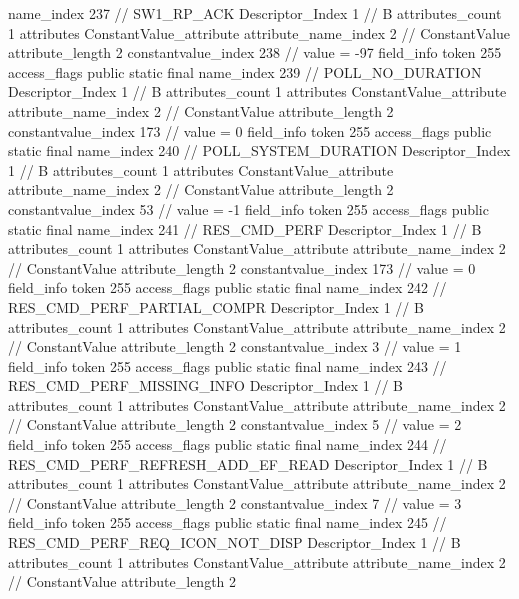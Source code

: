 {{{{{				name_index	237		// SW1_RP_ACK
				Descriptor_Index	1		// B
				attributes_count	1
				attributes {
				ConstantValue_attribute {
					attribute_name_index	2		// ConstantValue
					attribute_length	2
					constantvalue_index	238		// value = -97
				}
				}
			}
			field_info {
				token	255
				access_flags	public static final
				name_index	239		// POLL_NO_DURATION
				Descriptor_Index	1		// B
				attributes_count	1
				attributes {
				ConstantValue_attribute {
					attribute_name_index	2		// ConstantValue
					attribute_length	2
					constantvalue_index	173		// value = 0
				}
				}
			}
			field_info {
				token	255
				access_flags	public static final
				name_index	240		// POLL_SYSTEM_DURATION
				Descriptor_Index	1		// B
				attributes_count	1
				attributes {
				ConstantValue_attribute {
					attribute_name_index	2		// ConstantValue
					attribute_length	2
					constantvalue_index	53		// value = -1
				}
				}
			}
			field_info {
				token	255
				access_flags	public static final
				name_index	241		// RES_CMD_PERF
				Descriptor_Index	1		// B
				attributes_count	1
				attributes {
				ConstantValue_attribute {
					attribute_name_index	2		// ConstantValue
					attribute_length	2
					constantvalue_index	173		// value = 0
				}
				}
			}
			field_info {
				token	255
				access_flags	public static final
				name_index	242		// RES_CMD_PERF_PARTIAL_COMPR
				Descriptor_Index	1		// B
				attributes_count	1
				attributes {
				ConstantValue_attribute {
					attribute_name_index	2		// ConstantValue
					attribute_length	2
					constantvalue_index	3		// value = 1
				}
				}
			}
			field_info {
				token	255
				access_flags	public static final
				name_index	243		// RES_CMD_PERF_MISSING_INFO
				Descriptor_Index	1		// B
				attributes_count	1
				attributes {
				ConstantValue_attribute {
					attribute_name_index	2		// ConstantValue
					attribute_length	2
					constantvalue_index	5		// value = 2
				}
				}
			}
			field_info {
				token	255
				access_flags	public static final
				name_index	244		// RES_CMD_PERF_REFRESH_ADD_EF_READ
				Descriptor_Index	1		// B
				attributes_count	1
				attributes {
				ConstantValue_attribute {
					attribute_name_index	2		// ConstantValue
					attribute_length	2
					constantvalue_index	7		// value = 3
				}
				}
			}
			field_info {
				token	255
				access_flags	public static final
				name_index	245		// RES_CMD_PERF_REQ_ICON_NOT_DISP
				Descriptor_Index	1		// B
				attributes_count	1
				attributes {
				ConstantValue_attribute {
					attribute_name_index	2		// ConstantValue
					attribute_length	2
}}}}}}}
